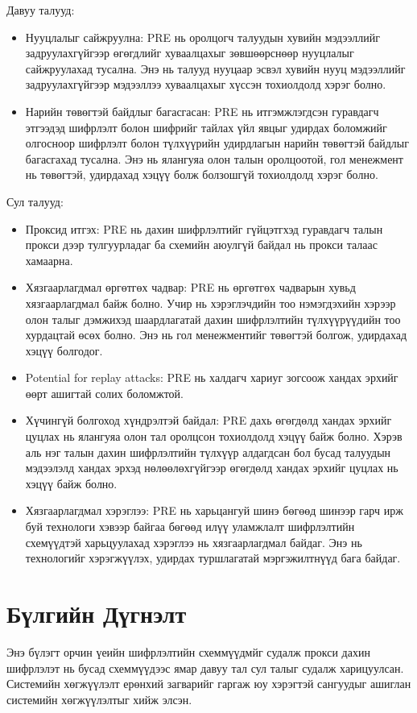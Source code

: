 Давуу талууд:
\begin{itemize}
    \item Нууцлалыг сайжруулна: PRE нь оролцогч талуудын хувийн мэдээллийг задруулахгүйгээр өгөгдлийг хуваалцахыг зөвшөөрснөөр нууцлалыг сайжруулахад тусална. Энэ нь талууд нууцаар эсвэл хувийн нууц мэдээллийг задруулахгүйгээр мэдээллээ хуваалцахыг хүссэн тохиолдолд хэрэг болно.
    \item Нарийн төвөгтэй байдлыг багасгасан: PRE нь итгэмжлэгдсэн гуравдагч этгээдэд шифрлэлт болон шифрийг тайлах үйл явцыг удирдах боломжийг олгосноор шифрлэлт болон түлхүүрийн удирдлагын нарийн төвөгтэй байдлыг багасгахад тусална. Энэ нь ялангуяа олон талын оролцоотой, гол менежмент нь төвөгтэй, удирдахад хэцүү болж болзошгүй тохиолдолд хэрэг болно.
\end{itemize}

Сул талууд:
\begin{itemize}
    \item Проксид итгэх: PRE нь дахин шифрлэлтийг гүйцэтгхэд гуравдагч талын прокси дээр тулгуурладаг ба схемийн аюулгүй байдал нь прокси талаас хамаарна.
    \item Хязгаарлагдмал өргөтгөх чадвар: PRE нь өргөтгөх чадварын хувьд хязгаарлагдмал байж болно. Учир нь хэрэглэчдийн тоо нэмэгдэхийн хэрээр олон талыг дэмжихэд шаардлагатай дахин шифрлэлтийн түлхүүрүүдийн тоо хурдацтай өсөх болно. Энэ нь гол менежментийг төвөгтэй болгож, удирдахад хэцүү болгодог.
    \item Potential for replay attacks: PRE нь халдагч хариуг зогсоож хандах эрхийг өөрт ашигтай солих боломжтой. 
    \item Хүчингүй болгоход хүндрэлтэй байдал: PRE дахь өгөгдөлд хандах эрхийг цуцлах нь ялангуяа олон тал оролцсон тохиолдолд хэцүү байж болно. Хэрэв аль нэг талын дахин шифрлэлтийн түлхүүр алдагдсан бол бусад талуудын мэдээлэлд хандах эрхэд нөлөөлөхгүйгээр өгөгдөлд хандах эрхийг цуцлах нь хэцүү байж болно.
    \item Хязгаарлагдмал хэрэглээ: PRE нь харьцангуй шинэ бөгөөд шинээр гарч ирж буй технологи хэвээр байгаа бөгөөд илүү уламжлалт шифрлэлтийн схемүүдтэй харьцуулахад хэрэглээ нь хязгаарлагдмал байдаг. Энэ нь технологийг хэрэгжүүлэх, удирдах туршлагатай мэргэжилтнүүд бага байдаг.
\end{itemize}


\section{Бүлгийн Дүгнэлт}
Энэ бүлэгт орчин үеийн шифрлэлтийн схеммүүдмйг судалж прокси дахин шифрлэлэт нь бусад схеммүүдээс ямар давуу тал сул талыг судалж харицуулсан. Системийн хөгжүүлэлт ерөнхий загварийг гаргаж юу хэрэгтэй сангуудыг ашиглан системийн хөгжүүлэлтыг хийж элсэн.